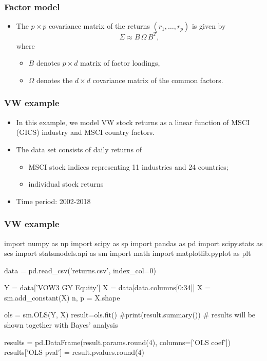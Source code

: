 \documentclass[xcolor=table,10pt]{beamer}
\begin{document}
\begin{frame}
  \frametitle{Factor model}
  \begin{itemize}
  \item The $p \times p$ covariance matrix of the returns $(r_1,
    \ldots, r_p)$ is given by
    \begin{equation*}
      \Sigma \approx B\, \Omega\, B^T,
    \end{equation*}
    where 
    \begin{itemize}
      \addtolength{\itemsep}{3pt}
    \item $B$ denotes $p\times d$ matrix of factor loadings,
    \item $\Omega$ denotes the $d\times d$ covariance matrix of
      the common factors.
    \end{itemize}
  \end{itemize}
\end{frame}

\begin{frame}
  \frametitle{VW example}
  \begin{itemize}
  \item In this example, we model VW stock returns as a linear
    function of \alert{MSCI (GICS) industry} and \alert{MSCI country
      factors}. 
  \item The data set consists of daily returns of
    \begin{itemize}
    \item MSCI stock indices representing 11 industries and 24
      countries;
    \item individual stock returns
    \end{itemize}
  \item Time period: 2002-2018
  \end{itemize}
\end{frame}

\begin{frame}[fragile]
  \frametitle{VW example}
{\scriptsize%
  \begin{pyconsole}[vw][frame=single]
import numpy as np
import scipy as sp
import pandas as pd
import scipy.stats as scs
import statsmodels.api as sm
import math
import matplotlib.pyplot as plt

data = pd.read_csv('returns.csv', index_col=0)

Y = data['VOW3 GY Equity']
X = data[data.columns[0:34]]
X = sm.add_constant(X)
n, p = X.shape

ols = sm.OLS(Y, X)
result=ols.fit()
#print(result.summary()) # results will be shown together with Bayes' analysis

results = pd.DataFrame(result.params.round(4), columns=['OLS coef'])
results['OLS pval'] = result.pvalues.round(4)
\end{pyconsole}
}
\end{frame}
\end{document}
